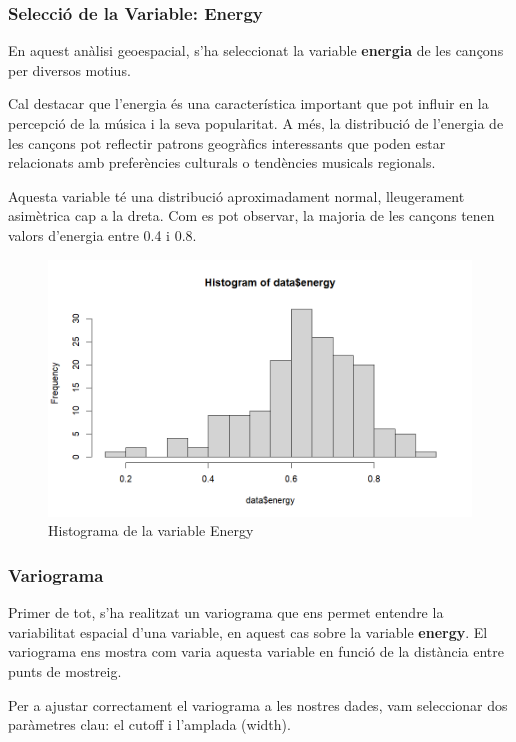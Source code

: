 \subsubsection{Selecció de la Variable: Energy}

En aquest anàlisi geoespacial, s'ha seleccionat la variable \textbf{energia} de les cançons per diversos motius. 

Cal destacar que l'energia és una característica important que pot influir en la percepció de la música i la seva popularitat. A més, la distribució de l'energia de les cançons pot reflectir patrons geogràfics interessants que poden estar relacionats amb preferències culturals o tendències musicals regionals.

Aquesta variable té una distribució aproximadament normal, lleugerament asimètrica cap a la dreta. Com es pot observar, la majoria de les cançons tenen valors d'energia entre 0.4 i 0.8.

\begin{figure}[h!]
    \centering
    \includegraphics[width=0.85\linewidth]{histograma_energy.png}
    \caption{Histograma de la variable Energy}
    \label{fig:histogram_energy}
\end{figure}

\subsubsection{Variograma}

Primer de tot, s'ha realitzat un variograma que ens permet entendre la variabilitat espacial d'una variable, en aquest cas sobre la variable \textbf{energy}. El variograma ens mostra com varia aquesta variable en funció de la distància entre punts de mostreig.

Per a ajustar correctament el variograma a les nostres dades, vam seleccionar dos paràmetres clau: el cutoff i l'amplada (width).

